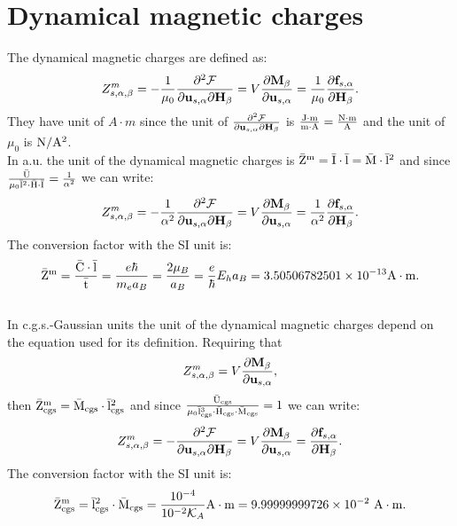 \documentclass[12pt,a4paper,twoside]{report}
\def\bardmc{3.50506782501\times 10^{-13}}
\def\zmtozm{9.99999999726\times 10^{-2}}
\begin{document}
\newpage
{\color{coral}\section{Dynamical magnetic charges}}
\color{black}

The dynamical magnetic charges are defined as:
\begin{equation}
Z^m_{s,\alpha,\beta}= -{1\over \mu_0} {\partial^2 \mathcal{F} \over \partial 
{\bf u}_{s,\alpha} \partial {\bf H}_{\beta}}=V {\partial {\bf M}_{\beta}
\over \partial {\bf u}_{s,\alpha}}= {1\over \mu_0}{\partial {\bf f}_{s,\alpha} 
\over \partial {\bf H}_{\beta}}. 
\end{equation}
They have unit of $A\cdot m$ since the unit of 
${\partial^2 \mathcal{F} \over \partial 
{\bf u}_{s,\alpha} \partial {\bf H}_{\beta}}$ is ${{\rm J} \cdot {\rm m} \over {\rm m}\cdot {\rm A}}=
{{\rm N}\cdot {\rm m} \over {\rm A}}$ and the unit of $\mu_0$ is ${\rm N}/{\rm A}^2$.
\\

{\color{web-blue} In a.u. the unit of the dynamical magnetic charges is
${\rm \bar Z^m} = {\rm \bar I}\cdot {\rm \bar l} = {\rm \bar M}\cdot {\rm \bar l}^2$ and since 
${{\rm \bar U} \over \mu_0 {\rm \bar l}^2 \cdot {\rm \bar H}\cdot {\rm \bar I}}={1\over \alpha^2}$ we can write:
\begin{equation}
Z^m_{s,\alpha,\beta}=-{1\over \alpha^2} {\partial^2 \mathcal{F} \over \partial 
{\bf u}_{s,\alpha} \partial {\bf H}_{\beta}}=
V {\partial {\bf M}_{\beta} \over \partial {\bf u}_{s,\alpha}}=
{1\over \alpha^2}{\partial {\bf f}_{s,\alpha} \over \partial {\bf H}_{\beta}}.
\end{equation}
The conversion factor with the SI unit is:
\begin{equation}
{\rm \bar Z^m} = {{\rm \bar C}\cdot {\rm \bar l} \over {\rm \bar t}} = {e \hbar \over m_e a_B}={2 \mu_B \over a_B} = {e \over \hbar} E_h a_B=\bardmc {\rm A}\cdot {\rm m}.
\end{equation}
}
\\

{\color{orange} In c.g.s.-Gaussian units the unit of the dynamical magnetic 
charges depend on the equation used for its definition.
Requiring that
\begin{equation}
Z^m_{s,\alpha,\beta}= V 
{\partial {\bf M}_{\beta} \over \partial {\bf u}_{s,\alpha}},
\end{equation}
then ${\rm \bar Z^m_{cgs}} = {\rm \bar M_{cgs}}\cdot {\rm \bar l_{cgs}}^2$ 
and since 
${{\rm \bar U_{cgs}} \over \mu_0 {\rm \bar l_{cgs}}^3\cdot {\rm \bar H_{cgs}}
\cdot {\rm \bar M_{cgs}}}=1
$ we can write:
\begin{equation}
Z^m_{s,\alpha,\beta}=-{\partial^2 \mathcal{F} \over \partial 
{\bf u}_{s,\alpha} \partial {\bf H}_{\beta}}= V 
{\partial {\bf M}_{\beta} \over \partial {\bf u}_{s,\alpha}}=
{\partial {\bf f}_{s,\alpha} \over \partial {\bf H}_{\beta}}.
\end{equation}
The conversion factor with the SI unit is:
\begin{equation}
{\rm \bar Z^m_{cgs}} = {\rm \bar l_{cgs}}^2\cdot {\rm \bar M_{cgs}}={10^{-4} \over 10^{-2} 
\mathcal{K}_A}
{\rm A}\cdot {\rm m}=\zmtozm\ {\rm A}\cdot {\rm m}.
\end{equation}
}
\end{document}
